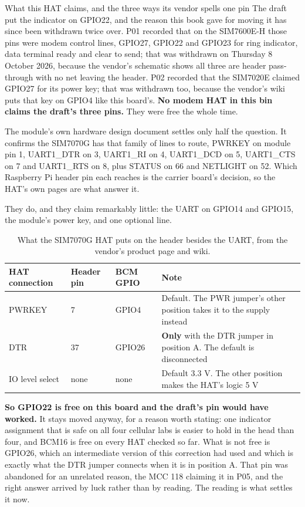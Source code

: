 \begin{note}{What this HAT claims, and the three ways its vendor spells one pin}
The draft put the indicator on GPIO22, and the reason this book gave for moving it has since been withdrawn twice over. P01 recorded that on the SIM7600E-H those pins were modem control lines, GPIO27, GPIO22 and GPIO23 for ring indicator, data terminal ready and clear to send; that was withdrawn on Thursday 8 October 2026, because the vendor's schematic shows all three are header pass-through with no net leaving the header. P02 recorded that the SIM7020E claimed GPIO27 for its power key; that was withdrawn too, because the vendor's wiki puts that key on GPIO4 like this board's. \textbf{No modem HAT in this bin claims the draft's three pins.} They were free the whole time.

The module's own hardware design document settles only half the question. It confirms the SIM7070G has that family of lines to route, PWRKEY on module pin 1, UART1\_DTR on 3, UART1\_RI on 4, UART1\_DCD on 5, UART1\_CTS on 7 and UART1\_RTS on 8, plus STATUS on 66 and NETLIGHT on 52. Which Raspberry Pi header pin each reaches is the carrier board's decision, so the HAT's own pages are what answer it.

They do, and they claim remarkably little: the UART on GPIO14 and GPIO15, the module's power key, and one optional line.

\begin{table}[H]\centering\small
\begin{tabular}{p{34mm}p{26mm}p{20mm}p{56mm}}
\toprule
HAT connection & Header pin & BCM GPIO & Note \\
\midrule
PWRKEY & 7 & GPIO4 & Default. The PWR jumper's other position takes it to the supply instead \\
DTR & 37 & GPIO26 & \textbf{Only} with the DTR jumper in position A. The default is disconnected \\
IO level select & none & none & Default 3.3 V. The other position makes the HAT's logic 5 V \\
\bottomrule
\end{tabular}
\caption{What the SIM7070G HAT puts on the header besides the UART, from the vendor's product page and wiki.}
\end{table}

\textbf{So GPIO22 is free on this board and the draft's pin would have worked.} It stays moved anyway, for a reason worth stating: one indicator assignment that is safe on all four cellular labs is easier to hold in the head than four, and BCM16 is free on every HAT checked so far. What is not free is GPIO26, which an intermediate version of this correction had used and which is exactly what the DTR jumper connects when it is in position A. That pin was abandoned for an unrelated reason, the MCC 118 claiming it in P05, and the right answer arrived by luck rather than by reading. The reading is what settles it now.


\end{note}
